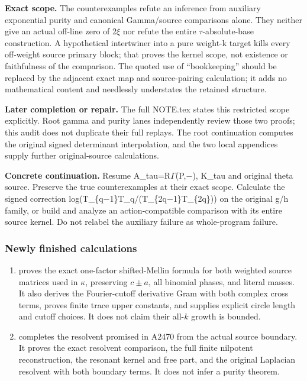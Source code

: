 \textbf{Exact scope.} The counterexamples refute an inference from
auxiliary exponential purity and canonical Gamma/source comparisons
alone. They neither give an actual off-line zero of
2\allowbreak{}\ensuremath{ξ}\allowbreak{} nor refute the entire
\allowbreak{}\ensuremath{τ}\allowbreak{}-absolute-base construction. A
hypothetical intertwiner into a pure weight-k target kills every
off-weight source primary block; that proves the kernel scope, not
existence or faithfulness of the comparison. The quoted use of
``bookkeeping'' should be replaced by the adjacent exact map and
source-pairing calculation; it adds no mathematical content and
needlessly understates the retained structure.

\textbf{Later completion or repair.} The full NOTE.tex states this
restricted scope explicitly. Root gamma and purity lanes independently
review those two proofs; this audit does not duplicate their full
replays. The root continuation computes the original signed determinant
interpolation, and the two local appendices supply further
original-source calculations.

\textbf{Concrete continuation.} Resume
A\_tau=R\allowbreak{}\ensuremath{Γ}\allowbreak{}(P,\allowbreak{}\ensuremath{−}\allowbreak{}),
K\_tau and original theta source. Preserve the true counterexamples at
their exact scope. Calculate the signed correction
log(T\_\{q\allowbreak{}\ensuremath{−}\allowbreak{}1\}T\_q/(T\_\{2q\allowbreak{}\ensuremath{−}\allowbreak{}1\}T\_\{2q\}))
on the original g/h family, or build and analyze an action-compatible
comparison with its entire source kernel. Do not relabel the auxiliary
failure as whole-program failure.

\subsubsection{Newly finished
calculations}\label{newly-finished-calculations}

\begin{enumerate}
\def\labelenumi{\arabic{enumi}.}
\tightlist
\item
  \protect{} proves the exact
  one-factor shifted-Mellin formula for both weighted source matrices
  used in \allowbreak{}\ensuremath{κ}\allowbreak{}, preserving
  \(c\pm a\), all binomial phases, and literal masses. It also derives
  the Fourier-cutoff derivative Gram with both complex cross terms,
  proves finite trace upper constants, and supplies explicit circle
  length and cutoff choices. It does not claim their all-\(k\) growth is
  bounded.
\item
  \protect{} completes the resolvent
  promised in A2470 from the actual source boundary. It proves the exact
  resolvent comparison, the full finite nilpotent reconstruction, the
  resonant kernel and free part, and the original Laplacian resolvent
  with both boundary terms. It does not infer a purity theorem.
\end{enumerate}

